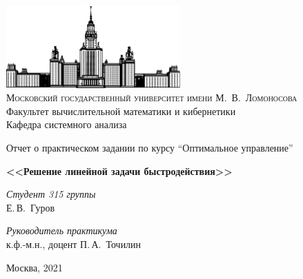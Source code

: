 \documentclass[10pt]{article}
\begin{document}
\thispagestyle{empty}

\begin{center}
\ \vspace{-3cm}

\includegraphics[width=0.5\textwidth]{msu.png}\\
{\scshape Московский государственный университет имени М.~В.~Ломоносова}\\
Факультет вычислительной математики и кибернетики\\
Кафедра системного анализа

\vfill

{\LARGE Отчет о практическом задании по курсу ``Оптимальное управление'' }

\vspace{1cm}

{\Huge\bfseries <<Решение линейной задачи быстродействия>>}
\end{center}

\vspace{1cm}

\begin{flushright}
  \large
  \textit{Студент 315 группы}\\
  Е.\,В.~Гуров

  \vspace{5mm}

  \textit{Руководитель практикума}\\
  к.ф.-м.н., доцент П.\,А.~Точилин
\end{flushright}

\vfill

\begin{center}
Москва, 2021
\end{center}
\newpage

\tableofcontents
\newpage
\end{document}
